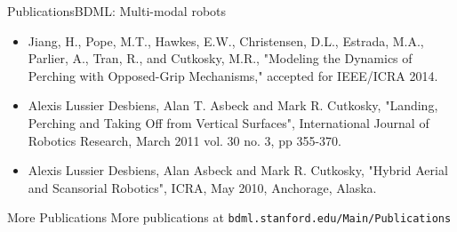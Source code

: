\documentclass{beamer}
\begin{document}
\begin{frame}{Publications}{BDML: Multi-modal robots}

\begin{itemize}
  \item Jiang, H., Pope, M.T., Hawkes, E.W., Christensen, D.L., Estrada, M.A., Parlier, A., Tran, R., and Cutkosky, M.R., "Modeling the Dynamics of Perching with Opposed-Grip Mechanisms," accepted for IEEE/ICRA 2014.
  \item Alexis Lussier Desbiens, Alan T. Asbeck and Mark R. Cutkosky, "Landing, Perching and Taking Off from Vertical Surfaces", International Journal of Robotics Research, March 2011 vol. 30 no. 3, pp 355-370.
  \item Alexis Lussier Desbiens, Alan Asbeck and Mark R. Cutkosky, "Hybrid Aerial and Scansorial Robotics", ICRA, May 2010, Anchorage, Alaska.
\end{itemize}


\begin{block}{More Publications}
More publications at \texttt{bdml.stanford.edu/Main/Publications}
\end{block}

\end{frame}
\end{document}
